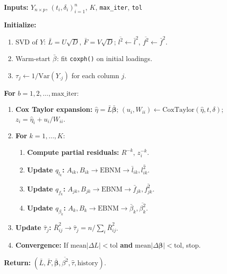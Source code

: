 \documentclass[11pt]{article}
\newcommand{\lbar}[2]{\bar{l}_{#1#2}}
\newcommand{\fbar}[2]{\bar{f}_{#1#2}}
\newcommand{\betabar}[1]{\bar{\beta}_{#1}}
\newcommand{\lsec}[2]{\overline{l^2_{#1#2}}}
\newcommand{\fsec}[2]{\overline{f^2_{#1#2}}}
\newcommand{\betasec}[1]{\overline{\beta^2_{#1}}}
\begin{document}
\begin{algorithmbox}
\textbf{Inputs:} $Y_{n\times p}$, $(t_i, \delta_i)_{i=1}^n$, $K$,
\texttt{max\_iter}, \texttt{tol}

\medskip
\textbf{Initialize:}
\begin{enumerate}[noitemsep]
\item SVD of $Y$: $\bar{L} = U\sqrt{D}$, $\bar{F} = V\sqrt{D}$;
      $\lsec{}{} \leftarrow \lbar{}{}^2$, $\fsec{}{} \leftarrow \fbar{}{}^2$.
\item Warm-start $\betabar{}$: fit \texttt{coxph()} on initial loadings.
\item $\tau_j \leftarrow 1/\mathrm{Var}(Y_{\cdot j})$ for each column $j$.
\end{enumerate}

\medskip
\textbf{For} $b = 1, 2, \ldots, \text{max\_iter}$:

\begin{enumerate}[noitemsep, label=\arabic*.]
\item \textbf{Cox Taylor expansion:}
      $\hat{\eta} = \bar{L}\bar{\bm{\beta}}$;
      $(u_i, W_{ii}) \leftarrow \text{CoxTaylor}(\hat{\eta}, t, \delta)$;
      $z_i = \hat{\eta}_i + u_i/W_{ii}$.

\item \textbf{For} $k = 1, \ldots, K$:
\begin{enumerate}[noitemsep, label=(\alph*)]
  \item \textbf{Compute partial residuals:}
        $R^{-k}$, $z^{-k}_i$.

  \item \textbf{Update $q_{l_k}$:}
        $A_{ik}, B_{ik} \rightarrow \text{EBNM} \rightarrow \lbar{i}{k}, \lsec{i}{k}$.

  \item \textbf{Update $q_{f_k}$:}
        $A_{jk}, B_{jk} \rightarrow \text{EBNM} \rightarrow \fbar{j}{k}, \fsec{j}{k}$.

  \item \textbf{Update $q_{\beta_k}$:}
        $A_k, B_k \rightarrow \text{EBNM} \rightarrow \betabar{k}, \betasec{k}$.
\end{enumerate}

\item \textbf{Update $\hat{\tau}_j$:}
      $\bar{R}^2_{ij} \rightarrow \hat{\tau}_j = n / \sum_i \bar{R}^2_{ij}$.

\item \textbf{Convergence:}
      If $\text{mean}|\Delta L| < \text{tol}$ \textbf{and}
      $\text{mean}|\Delta\bm{\beta}| < \text{tol}$, stop.
\end{enumerate}

\medskip
\textbf{Return:} $(\bar{L}, \bar{F}, \bar{\bm{\beta}}, \betasec{}, \hat{\tau}, \text{history})$.
\end{algorithmbox}
\end{document}
